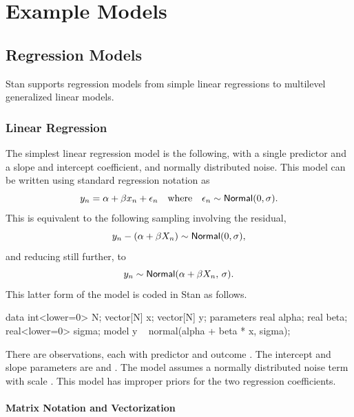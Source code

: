\part{Example Models}\label{example-models.part}

\chapter{Regression Models}

\noindent
Stan supports regression models from simple linear regressions to
multilevel generalized linear models.

\section{Linear Regression}

The simplest linear regression model is the following, with a single
predictor and a slope and intercept coefficient, and normally
distributed noise.  This model can be written using standard
regression notation as
%
\[
y_n = \alpha + \beta x_n + \epsilon_n
\ \ \ \mbox{where} \ \ \
\epsilon_n \sim \mbox{\sf Normal}(0,\sigma).
\]
This is equivalent to the following sampling involving the
residual,
\[
y_n - (\alpha + \beta X_n) \sim \mbox{\sf Normal}(0,\sigma),
\]
and reducing still further, to
\[
y_n \sim \mbox{\sf Normal}(\alpha + \beta X_n, \, \sigma).
\]
%
This latter form of the model is coded in Stan as follows.
%
\begin{stancode}
data {
  int<lower=0> N;
  vector[N] x;
  vector[N] y;
}
parameters {
  real alpha;
  real beta;
  real<lower=0> sigma;
}
model {
  y ~ normal(alpha + beta * x, sigma);
}
\end{stancode}
%
There are  observations, each with predictor  and
outcome \code{y[n]}.  The intercept and slope parameters are
 and .  The model assumes a normally
distributed noise term with scale .  This model has
improper priors for the two regression coefficients.

\subsection{Matrix Notation and Vectorization}

